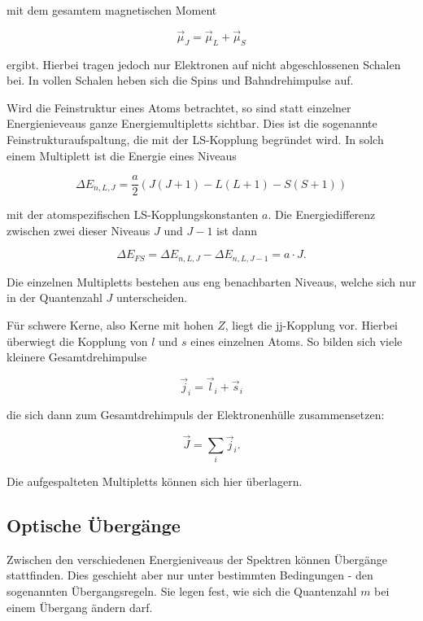 mit dem gesamtem magnetischen Moment

\begin{equation}
\vec{\mu}_J=\vec{\mu}_L+\vec{\mu}_S
\end{equation}

ergibt. Hierbei tragen jedoch nur Elektronen auf nicht abgeschlossenen Schalen bei. In vollen Schalen heben sich die Spins
und Bahndrehimpulse auf.

Wird die Feinstruktur eines Atoms betrachtet, so sind statt einzelner Energienieveaus ganze Energiemultipletts sichtbar.
Dies ist die sogenannte Feinstrukturaufspaltung, die mit der LS-Kopplung begründet wird.
In solch einem Multiplett ist die Energie eines Niveaus

\begin{equation}
	\Delta E_{n,L,J} = \frac{a}{2}(J(J+1)-L(L+1)-S(S+1))
\end{equation}

mit der atomspezifischen LS-Kopplungskonstanten $a$. Die Energiedifferenz zwischen zwei dieser Niveaus $J$ und $J-1$ ist
dann

\begin{equation}
	\Delta E_{FS} = \Delta E_{n,L,J} - \Delta E_{n,L,J-1} = a \cdot J .
\end{equation}

Die einzelnen Multipletts bestehen aus eng benachbarten Niveaus, welche sich nur in der Quantenzahl $J$ unterscheiden.

Für schwere Kerne, also Kerne mit hohen $Z$, liegt die jj-Kopplung vor. Hierbei überwiegt die Kopplung von $l$ und $s$
eines einzelnen Atoms. So bilden sich viele kleinere Gesamtdrehimpulse

\begin{equation}
	\vec{j}_i=\vec{l}_i+\vec{s}_i
\end{equation}

die sich dann zum Gesamtdrehimpuls der Elektronenhülle zusammensetzen:

\begin{equation}
	\vec{J}=\sum_i \vec{j}_i .
\end{equation}

Die aufgespalteten Multipletts können sich hier überlagern.

\subsection{Optische Übergänge}

Zwischen den verschiedenen Energieniveaus der Spektren können Übergänge stattfinden. Dies geschieht aber nur unter bestimmten
Bedingungen - den sogenannten Übergangsregeln. Sie legen fest, wie sich die Quantenzahl $m$ bei einem Übergang ändern darf.

